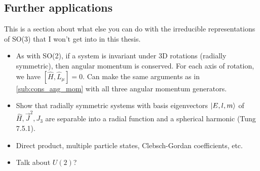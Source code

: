     \subsection{Further applications}
    This is a section about what else you can do with the irreducible representations of SO(3) that I won't get into in this thesis.
    \begin{itemize}
        \item As with SO(2), if a system is invariant under 3D rotations (radially symmetric), then angular momentum is conserved. For each axis of rotation, we have $[\hat{H},\hat{L}_\mu]=0$. Can make the same arguments as in \cref{sub:cons_ang_mom} with all three angular momentum generators.
        \item Show that radially symmetric systems with basis eigenvectors $\ket{E,l,m}$ of $\hat{H},\vec{J}^2,J_3$ are separable into a radial function and a spherical harmonic (Tung 7.5.1).
        \item Direct product, multiple particle states, Clebsch-Gordan coefficients, etc.
        \item Talk about $U(2)$?
    \end{itemize}

